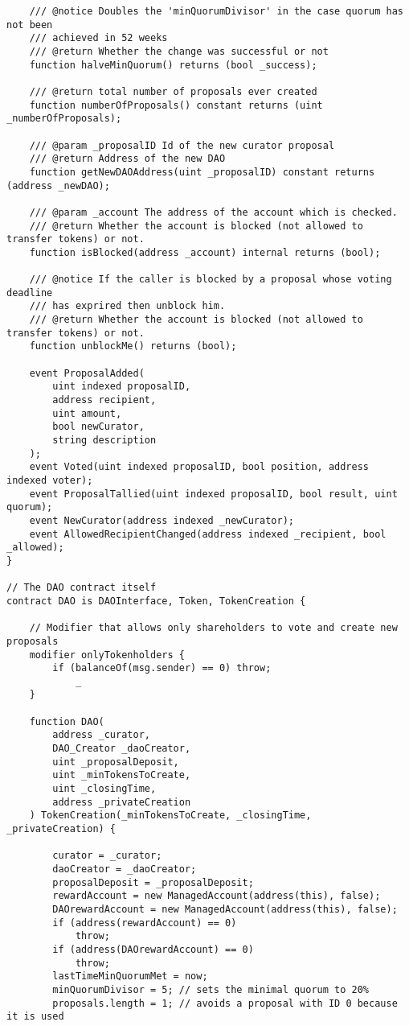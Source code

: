 \documentclass[9pt,oneside]{amsart}
\begin{document}
\begin{appendix}
\begin{verbatim}
    /// @notice Doubles the 'minQuorumDivisor' in the case quorum has not been
    /// achieved in 52 weeks
    /// @return Whether the change was successful or not
    function halveMinQuorum() returns (bool _success);

    /// @return total number of proposals ever created
    function numberOfProposals() constant returns (uint _numberOfProposals);

    /// @param _proposalID Id of the new curator proposal
    /// @return Address of the new DAO
    function getNewDAOAddress(uint _proposalID) constant returns (address _newDAO);

    /// @param _account The address of the account which is checked.
    /// @return Whether the account is blocked (not allowed to transfer tokens) or not.
    function isBlocked(address _account) internal returns (bool);

    /// @notice If the caller is blocked by a proposal whose voting deadline
    /// has exprired then unblock him.
    /// @return Whether the account is blocked (not allowed to transfer tokens) or not.
    function unblockMe() returns (bool);

    event ProposalAdded(
        uint indexed proposalID,
        address recipient,
        uint amount,
        bool newCurator,
        string description
    );
    event Voted(uint indexed proposalID, bool position, address indexed voter);
    event ProposalTallied(uint indexed proposalID, bool result, uint quorum);
    event NewCurator(address indexed _newCurator);
    event AllowedRecipientChanged(address indexed _recipient, bool _allowed);
}

// The DAO contract itself
contract DAO is DAOInterface, Token, TokenCreation {

    // Modifier that allows only shareholders to vote and create new proposals
    modifier onlyTokenholders {
        if (balanceOf(msg.sender) == 0) throw;
            _
    }

    function DAO(
        address _curator,
        DAO_Creator _daoCreator,
        uint _proposalDeposit,
        uint _minTokensToCreate,
        uint _closingTime,
        address _privateCreation
    ) TokenCreation(_minTokensToCreate, _closingTime, _privateCreation) {

        curator = _curator;
        daoCreator = _daoCreator;
        proposalDeposit = _proposalDeposit;
        rewardAccount = new ManagedAccount(address(this), false);
        DAOrewardAccount = new ManagedAccount(address(this), false);
        if (address(rewardAccount) == 0)
            throw;
        if (address(DAOrewardAccount) == 0)
            throw;
        lastTimeMinQuorumMet = now;
        minQuorumDivisor = 5; // sets the minimal quorum to 20%
        proposals.length = 1; // avoids a proposal with ID 0 because it is used


\end{verbatim}
\end{appendix}
\end{document}
